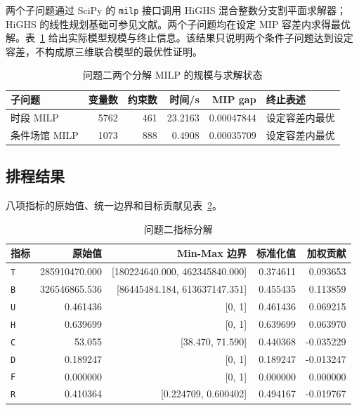 两个子问题通过 SciPy 的 \texttt{milp} 接口调用 HiGHS 混合整数分支割平面求解器\cite{scipymilp,highs}；HiGHS 的线性规划基础可参见文献\cite{huangfu2018}。两个子问题均在设定 MIP 容差内求得最优解。表~\ref{tab:q2-solver} 给出实际模型规模与终止信息。该结果只说明两个条件子问题达到设定容差，不构成原三维联合模型的最优性证明。

\begin{table}[htbp]
\centering
\caption{问题二两个分解 MILP 的规模与求解状态}
\label{tab:q2-solver}
\small
\begin{tabular}{lrrrrl}
\toprule
子问题 & 变量数 & 约束数 & 时间/s & MIP gap & 终止表述\\
\midrule
时段 MILP & 5762 & 461 & 23.2163 & 0.00047844 & 设定容差内最优\\
条件场馆 MILP & 1073 & 888 & 0.4908 & 0.00035709 & 设定容差内最优\\
\bottomrule
\end{tabular}
\end{table}

\subsection{排程结果}

八项指标的原始值、统一边界和目标贡献见表~\ref{tab:q2-components}。

\begin{longtable}[]{@{}lrrrr@{}}
\caption{问题二指标分解}\label{tab:q2-components}\\
\toprule\noalign{}
指标 & 原始值 & Min-Max 边界 & 标准化值 & 加权贡献 \\
\midrule\noalign{}
\endhead
\bottomrule\noalign{}
\endlastfoot
\texttt{T} & 285910470.000 & {[}180224640.000, 462345840.000{]} & 0.374611 & 0.093653 \\
\texttt{B} & 326546865.536 & {[}86445484.184, 613637147.351{]} & 0.455435 & 0.113859 \\
\texttt{U} & 0.461436 & {[}0, 1{]} & 0.461436 & 0.069215 \\
\texttt{H} & 0.639699 & {[}0, 1{]} & 0.639699 & 0.063970 \\
\texttt{C} & 53.055 & {[}38.470, 71.590{]} & 0.440368 & -0.035229 \\
\texttt{D} & 0.189247 & {[}0, 1{]} & 0.189247 & -0.013247 \\
\texttt{F} & 0.000000 & {[}0, 1{]} & 0.000000 & 0.000000 \\
\texttt{R} & 0.410364 & {[}0.224709, 0.600402{]} & 0.494167 & -0.019767 \\
\end{longtable}

